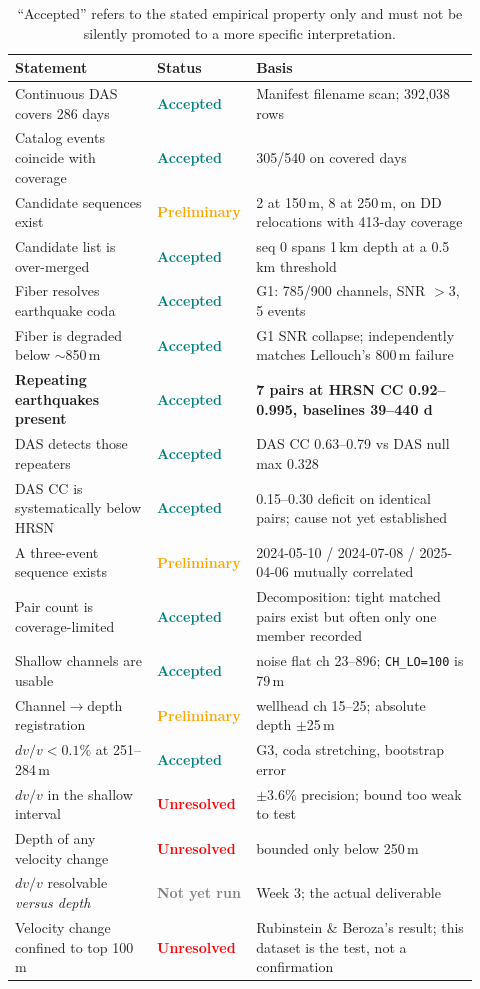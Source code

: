 \documentclass[11pt]{article}
\newcommand{\accepted}{\textcolor{teal}{\textbf{Accepted}}}
\newcommand{\preliminary}{\textcolor{orange}{\textbf{Preliminary}}}
\newcommand{\unresolved}{\textcolor{red}{\textbf{Unresolved}}}
\newcommand{\notrun}{\textcolor{gray}{\textbf{Not yet run}}}
\begin{document}
\begin{table}[H]
\centering
\small
\begin{tabular}{p{0.30\linewidth}p{0.15\linewidth}p{0.47\linewidth}}
\toprule
Statement & Status & Basis \\
\midrule
Continuous DAS covers 286 days & \accepted & Manifest filename scan; 392{,}038 rows \\
Catalog events coincide with coverage & \accepted & 305/540 on covered days \\
Candidate sequences exist & \preliminary & 2 at 150\,m, 8 at 250\,m, on DD relocations with 413-day coverage \\
Candidate list is over-merged & \accepted & seq 0 spans 1\,km depth at a 0.5\,km threshold \\
Fiber resolves earthquake coda & \accepted & G1: 785/900 channels, SNR $>3$, 5 events \\
Fiber is degraded below $\sim$850\,m & \accepted & G1 SNR collapse; independently matches Lellouch's 800\,m failure \\
\textbf{Repeating earthquakes present} & \accepted & \textbf{7 pairs at HRSN CC 0.92--0.995, baselines 39--440 d} \\
DAS detects those repeaters & \accepted & DAS CC 0.63--0.79 vs DAS null max 0.328 \\
DAS CC is systematically below HRSN & \accepted & 0.15--0.30 deficit on identical pairs; cause not yet established \\
A three-event sequence exists & \preliminary & 2024-05-10 / 2024-07-08 / 2025-04-06 mutually correlated \\
Pair count is coverage-limited & \accepted & Decomposition: tight matched pairs exist but often only one member recorded \\
Shallow channels are usable & \accepted & noise flat ch 23--896; \texttt{CH\_LO=100} is 79\,m \\
Channel$\to$depth registration & \preliminary & wellhead ch 15--25; absolute depth $\pm$25\,m \\
$dv/v < 0.1\%$ at 251--284\,m & \accepted & G3, coda stretching, bootstrap error \\
$dv/v$ in the shallow interval & \unresolved & $\pm$3.6\% precision; bound too weak to test \\
Depth of any velocity change & \unresolved & bounded only below 250\,m \\
$dv/v$ resolvable \emph{versus depth} & \notrun & Week 3; the actual deliverable \\
Velocity change confined to top 100\,m & \unresolved & Rubinstein \& Beroza's result; this dataset is the test, not a confirmation \\
\bottomrule
\end{tabular}
\caption{``Accepted'' refers to the stated empirical property only and must not
be silently promoted to a more specific interpretation.}
\end{table}
\end{document}
